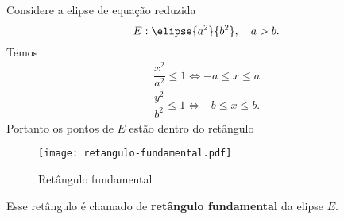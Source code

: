 Considere a elipse de equa\c{c}\~ao reduzida
\[
  E: \elipse{a^2}{b^2},\quad a > b.
\]
Temos
\begin{align*}
  \dfrac{x^2}{a^2} \le 1 \Leftrightarrow -a \le x \le a\\
  \dfrac{y^2}{b^2} \le 1 \Leftrightarrow -b \le x \le b.
\end{align*}
Portanto os pontos de $E$ est\~ao dentro do ret\^angulo
\begin{figure}[!h]
  \centering
  \caption{Ret\^angulo fundamental}
  \texttt{[image: retangulo-fundamental.pdf]}
\end{figure}
Esse ret\^angulo \'e chamado de \textbf{ret\^angulo fundamental} da elipse $E$.

